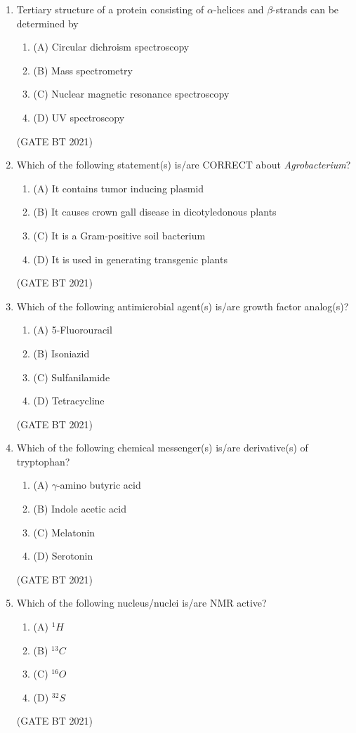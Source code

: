 \documentclass[journal,12pt,onecolumn]{IEEEtran}
\theoremstyle{remark}
\begin{document}
\begin{enumerate}
\item Tertiary structure of a protein consisting of $\alpha$-helices and $\beta$-strands can be determined by
\begin{enumerate}
\item (A) Circular dichroism spectroscopy
\item (B) Mass spectrometry
\item (C) Nuclear magnetic resonance spectroscopy
\item (D) UV spectroscopy
\end{enumerate}
\hfill (GATE BT 2021)

\item Which of the following statement(s) is/are CORRECT about \textit{Agrobacterium}?
\begin{enumerate}
\item (A) It contains tumor inducing plasmid
\item (B) It causes crown gall disease in dicotyledonous plants
\item (C) It is a Gram-positive soil bacterium
\item (D) It is used in generating transgenic plants
\end{enumerate}
\hfill (GATE BT 2021)

\item Which of the following antimicrobial agent(s) is/are growth factor analog(s)?
\begin{enumerate}
\item (A) 5-Fluorouracil
\item (B) Isoniazid
\item (C) Sulfanilamide
\item (D) Tetracycline
\end{enumerate}
\hfill (GATE BT 2021)

\item Which of the following chemical messenger(s) is/are derivative(s) of tryptophan?
\begin{enumerate}
\item (A) $\gamma$-amino butyric acid
\item (B) Indole acetic acid
\item (C) Melatonin
\item (D) Serotonin
\end{enumerate}
\hfill (GATE BT 2021)

\item Which of the following nucleus/nuclei is/are NMR active?
\begin{enumerate}
\item (A) $^{1}H$
\item (B) $^{13}C$
\item (C) $^{16}O$
\item (D) $^{32}S$
\end{enumerate}
\hfill (GATE BT 2021)


\end{enumerate}
\end{document}
